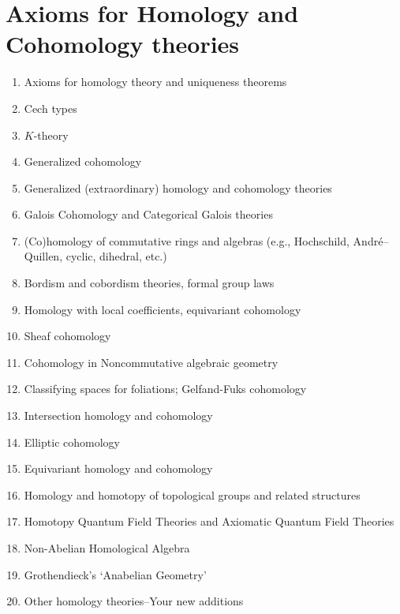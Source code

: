 \documentclass[12pt]{article}
\theoremstyle{plain}
\theoremstyle{definition}
\numberwithin{equation}{section}
\begin{document}
\section{Axioms for Homology and Cohomology theories}

\begin{enumerate}
\item Axioms for homology theory and uniqueness theorems
\item Cech types 
\item $K$-theory 
\item Generalized cohomology
\item Generalized (extraordinary) homology and cohomology theories
\item Galois Cohomology and Categorical Galois theories
\item (Co)homology of commutative rings and algebras (e.g., Hochschild, Andr\'e--Quillen, cyclic, dihedral, etc.)
\item Bordism and cobordism theories, formal group laws 
\item Homology with local coefficients, equivariant cohomology 
\item Sheaf cohomology 
\item Cohomology in Noncommutative algebraic geometry
\item Classifying spaces for foliations; Gelfand-Fuks cohomology
\item Intersection homology and cohomology 
\item Elliptic cohomology 
\item Equivariant homology and cohomology 
\item Homology and homotopy of topological groups and related structures
\item Homotopy Quantum Field Theories and Axiomatic Quantum Field Theories
\item Non-Abelian Homological Algebra
\item Grothendieck's `Anabelian Geometry'
\item Other homology theories--Your new additions 

\end{enumerate}
\end{document}
